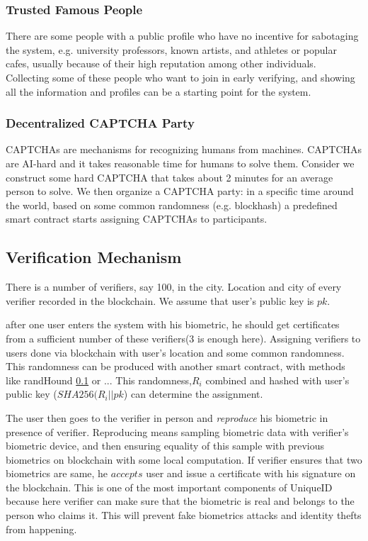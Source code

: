 \documentclass[conference]{IEEEtran}
\begin{document}
\subsubsection*{Trusted Famous People}
There are some people with a public profile who have no incentive for sabotaging the system, e.g. university professors, known artists, and athletes or popular cafes, usually because of their high reputation among other individuals. Collecting some of these people who want to join in early verifying, and showing all the information and profiles can be a starting point for the system.

\subsubsection*{Decentralized CAPTCHA Party}
CAPTCHAs \cite{CAPTCHA} are mechanisms for recognizing humans from machines. CAPTCHAs are AI-hard and it takes reasonable time for humans to solve them. Consider we construct some hard CAPTCHA that takes about 2 minutes for an average person to solve. We then organize a CAPTCHA party: in a specific time around the world, based on some common randomness (e.g. blockhash) a predefined smart contract starts assigning CAPTCHAs to participants. 

\subsection{Verification Mechanism}
There is a number of verifiers, say 100, in the city. Location and city of every verifier recorded in the blockchain. We assume that user's public key is $pk$.


 after one user enters the system with his biometric, he should get certificates from a sufficient number of these verifiers(3 is enough here). Assigning verifiers to users done via blockchain with user's location and some common randomness. This randomness can be produced with another smart contract, with methods like randHound \ref{} or ...   This randomness,$ R_i$ combined and hashed with user's public key ($SHA256(R_i || pk$) can determine the assignment. 
 
 
The user then goes to the verifier in person and \textit{reproduce}  his biometric in presence of verifier. Reproducing means sampling biometric data with verifier's biometric device, and then ensuring equality of this sample with previous biometrics on blockchain with some local computation. If verifier ensures that two biometrics are same, he $accepts$ user and issue a certificate with his signature on the blockchain. This is one of the most important components of UniqueID because here verifier can make sure that the biometric is real and belongs to the person who claims it. This will prevent fake biometrics attacks and identity thefts from happening.
\end{document}
